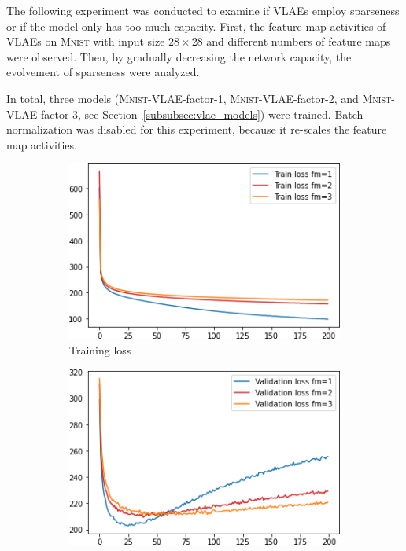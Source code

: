 The following experiment was conducted to examine if \acp{VLAE} employ sparseness or if the model only has too much capacity.
First, the feature map activities of \ac{VLAE}s on \textsc{Mnist} with input size $28\times 28$ and different numbers of feature maps were observed.
Then, by gradually decreasing the network capacity, the evolvement of sparseness were analyzed.

In total, three models (\textsc{Mnist}-\ac{VLAE}-factor-1, \textsc{Mnist}-\ac{VLAE}-factor-2, and \textsc{Mnist}-\ac{VLAE}-factor-3, see Section~\ref{subsubsec:vlae_models}) were trained.
Batch normalization was disabled for this experiment, because it re-scales the feature map activities.
\begin{figure}
    \centering
    \begin{subfigure}{.45\textwidth}
        \centering
        \includegraphics[width=\textwidth]{images/sparseness/sparseness_train_loss.png}
        \caption{Training loss}
    \end{subfigure}
    \hfill
    \begin{subfigure}{.45\textwidth}
        \centering
        \includegraphics[width=\textwidth]{images/sparseness/sparseness_validation_loss.png}

\end{subfigure}
\end{figure}

